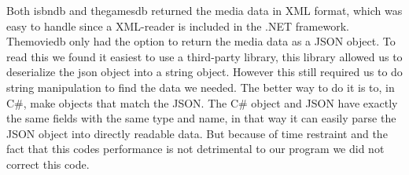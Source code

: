 Both isbndb and thegamesdb returned the media data in XML format, which was easy to handle since a XML-reader is included in the .NET framework. Themoviedb only had the option to return the media data as a JSON object. To read this we found it easiest to use a third-party library\cite{jamesJson}, this library allowed us to deserialize the json object into a string object. However this still required us to do string manipulation to find the data we needed. The better way to do it is to, in C\#, make objects that match the JSON. The C\# object and JSON have exactly the same fields with the same type and name, in that way it can easily parse the JSON object into directly readable data. But because of time restraint and the fact that this codes performance is not detrimental to our program we did not correct this code.



